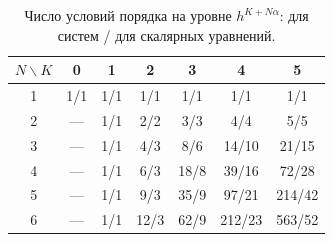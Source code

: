 \begin{table}[ht]
\centering\small
\caption{Число условий порядка на уровне $h^{K+N\alpha}$: для систем / для скалярных уравнений.}\label{tab:counts}
\begin{tabular}{c|cccccc}
\toprule
$N\backslash K$ & 0 & 1 & 2 & 3 & 4 & 5\\
\midrule
1 & 1/1 & 1/1 & 1/1 & 1/1 & 1/1 & 1/1\\
2 & --- & 1/1 & 2/2 & 3/3 & 4/4 & 5/5\\
3 & --- & 1/1 & 4/3 & 8/6 & 14/10 & 21/15\\
4 & --- & 1/1 & 6/3 & 18/8 & 39/16 & 72/28\\
5 & --- & 1/1 & 9/3 & 35/9 & 97/21 & 214/42\\
6 & --- & 1/1 & 12/3 & 62/9 & 212/23 & 563/52\\
\bottomrule
\end{tabular}
\end{table}
